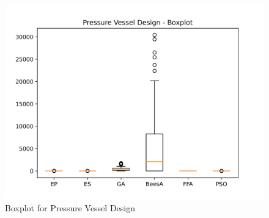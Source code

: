 \begin{figure}[H]
\centering
\caption{Boxplot for Pressure Vessel Design}
\label{fig:pressure_vessel_design_boxplot}
\includegraphics[scale=0.5]{images/pressure_vessel_problem_boxplot.png}
\end{figure}
